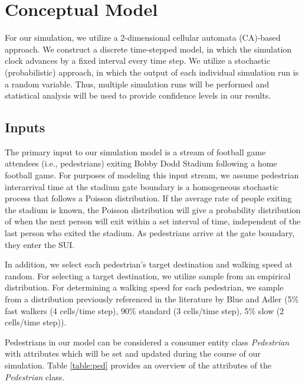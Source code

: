 \documentclass[12pt]{article}
\begin{document}
\section{Conceptual Model}
For our simulation, we utilize a 2-dimensional cellular automata (CA)-based
approach. We construct a discrete time-stepped model, in which the simulation
clock advances by a fixed interval every time step. We utilize a stochastic
(probabilistic) approach, in which the output of each individual simulation
run is a random variable. Thus, multiple simulation runs will be performed and
statistical analysis will be used to provide confidence levels in our results.

\subsection{Inputs}
The primary input to our simulation model is a stream of football game attendees
(i.e., pedestrians) exiting Bobby Dodd Stadium following a home football game.
For purposes of modeling this input stream, we assume pedestrian interarrival
time at the stadium gate boundary is a homogeneous stochastic process that
follows a Poisson distribution. If the average rate of people exiting the
stadium is known, the Poisson distribution will give a probability distribution
of when the next person will exit within a set interval of time, independent
of the last person who exited the stadium. As pedestrians arrive at the gate
boundary, they enter the SUI.

In addition, we select each pedestrian's target destination and walking
speed at random. For selecting a target destination, we utilize sample from
an empirical distribution. For determining a walking speed for each pedestrian,
we sample from a distribution previously referenced in the literature by Blue
and Adler \cite{blue2001cellular} (5\% fast walkers (4 cells/time step), 90\%
standard (3 cells/time step), 5\% slow (2 cells/time step)).

Pedestrians in our model can be considered a consumer entity class
\textit{Pedestrian} with attributes which will be set and updated during the
course of our simulation. Table \ref{table:ped} provides an overview of the
attributes of the \textit{Pedestrian} class.
\end{document}
